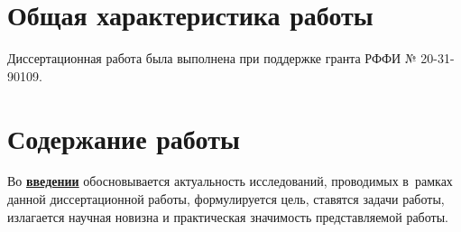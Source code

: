 \section*{Общая характеристика работы}

\newcommand{\actuality}{\pdfbookmark[1]{Актуальность}{actuality}\underline{\textbf{\actualityTXT}}}
\newcommand{\progress}{\pdfbookmark[1]{Разработанность темы}{progress}\underline{\textbf{\progressTXT}}}
\newcommand{\aim}{\pdfbookmark[1]{Цели}{aim}\underline{{\textbf\aimTXT}}}
\newcommand{\tasks}{\pdfbookmark[1]{Задачи}{tasks}\underline{\textbf{\tasksTXT}}}
\newcommand{\aimtasks}{\pdfbookmark[1]{Цели и задачи}{aimtasks}\aimtasksTXT}
\newcommand{\novelty}{\pdfbookmark[1]{Научная новизна}{novelty}\underline{\textbf{\noveltyTXT}}}
\newcommand{\influence}{\pdfbookmark[1]{Практическая значимость}{influence}\underline{\textbf{\influenceTXT}}}
\newcommand{\methods}{\pdfbookmark[1]{Методология и методы исследования}{methods}\underline{\textbf{\methodsTXT}}}
\newcommand{\defpositions}{\pdfbookmark[1]{Положения, выносимые на защиту}{defpositions}\underline{\textbf{\defpositionsTXT}}}
\newcommand{\reliability}{\pdfbookmark[1]{Достоверность}{reliability}\underline{\textbf{\reliabilityTXT}}}
\newcommand{\probation}{\pdfbookmark[1]{Апробация}{probation}\underline{\textbf{\probationTXT}}}
\newcommand{\contribution}{\pdfbookmark[1]{Личный вклад}{contribution}\underline{\textbf{\contributionTXT}}}
\newcommand{\publications}{\pdfbookmark[1]{Публикации}{publications}\underline{\textbf{\publicationsTXT}}}


Диссертационная работа была выполнена при поддержке гранта РФФИ № 20-31-90109.


\section*{Содержание работы}
Во \underline{\textbf{введении}} обосновывается актуальность
исследований, проводимых в~рамках данной диссертационной работы,
формулируется цель, ставятся задачи работы, излагается научная новизна
и практическая значимость представляемой работы.

